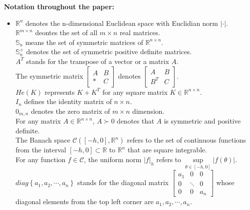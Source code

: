 \documentclass[a4paper]{cas-sc}
\begin{document}
\textbf{Notation throughout the paper:} 
\begin{itemize}
  \item[]
${\mathbb{R}^n}$ denotes the n-dimensional Euclidean space with Euclidian norm $| \cdot |$. \\
${\mathbb{R}^{m \times n}}$ deontes the set of all $m \times n$ real matrices. \\
$ {\mathbb{S}_n} $ means the set of symmetric matrices of ${\mathbb{R}^{n \times n}}$.\\
$\mathbb{S}_n^ + $ denotes the set of symmetric positive definite matrices.\\
${A^T} $ stands for the transpose of a vector or a matrix $A $.\\
The symmetric matrix $\left[ {\begin{array}{*{20}{c}}
  A & B \\
  * & C
\end{array}} \right]$ denotes $\left[ {\begin{array}{*{20}{c}}
  A       & B \\
  {{B^T}} & C
\end{array}} \right]$. \\
$ He\left( K \right)$ represents $K + {K^T}$ for any square matrix $ K \in {\mathbb{R}^{n \times n}}$.\\
${I_n} $ defines the identity matrix of $ n \times n $.\\
${0_{m,n}} $ denotes the zero matrix of $ m \times n$ dimension. \\
For any matrix $A \in {\mathbb{R}^{n \times n}} $, $ A \succ 0$ denotes that $A $ is symmetric and positive definite.\\
The Banach space $\mathcal{C}\left( {\left[ { - h,0} \right],{\mathbb{R}^n}} \right)$ refers to the set of continuous functions from the interval $\left[ { - h,0} \right] \subset \mathbb{R}$ to ${\mathbb{R}^n}$ that are square integrable. \\
For any function $f \in \mathcal{C}$, the uniform norm $|f{|_h}$ refers to $\mathop {\sup }\limits_{\theta  \in [ - h,0]} |f(\theta )|$. \\
$diag\left\{ {{a_1},{a_2}, \cdots ,{a_n}} \right\}$ stands for the diagonal matrix $\left[ {\begin{array}{*{20}{c}}
  {{a_1}} & 0      & 0       \\
  0       & \ddots & 0       \\
  0       & 0      & {{a_n}}
\end{array}} \right]$ whose diagonal elements from the top left corner are ${a_1},{a_2}, \cdots ,{a_n}$.\\

\end{itemize}
\end{document}
